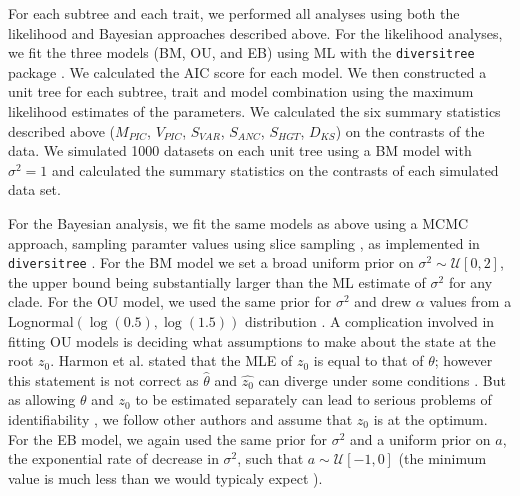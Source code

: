 \documentclass[a4paper,12pt]{article}
\begin{document}
For each subtree and each trait, we performed all analyses using both the likelihood and Bayesian approaches described above. For the likelihood analyses, we fit the three models (BM, OU, and EB) using ML with the \texttt{diversitree} package \citep{FitzJohn2012}. We calculated the AIC score for each model. We then constructed a unit tree for each subtree, trait and model combination using the maximum likelihood estimates of the parameters. We calculated the six summary statistics described above ($M_{PIC}$, $V_{PIC}$, $S_{VAR}$, $S_{ANC}$, $S_{HGT}$, $D_{KS}$) on the contrasts of the data. We simulated 1000 datasets on each unit tree using a BM model with $\sigma^2=1$ and calculated the summary statistics on the contrasts of each simulated data set. 

For the Bayesian analysis, we fit the same models as above using a MCMC approach, sampling paramter values using slice sampling \citep{Nealslice}, as implemented in  \texttt{diversitree} \citep{FitzJohn2012}. For the BM model we set a broad uniform prior on $\sigma^2 \sim \mathcal{U}[0, 2]$, the upper bound being substantially larger than the ML estimate of $\sigma^2$ for any clade. For the OU model, we used the same prior for $\sigma^2$ and drew $\alpha$ values from a Lognormal$(\log(0.5), \log(1.5))$ distribution \citep{UyedaBayou}. A complication involved in fitting OU models is deciding what assumptions to make about the state at the root $z_0$. Harmon et al. \citep{Harmon2010} stated that the MLE of $z_0$ is equal to that of $\theta$; however this statement is not correct as $\hat{\theta}$ and $\hat{z_0}$ can diverge under some conditions \citep{HoAne2012}. But as allowing $\theta$ and $z_0$ to be estimated separately can lead to serious problems of identifiability \citep{HoAne2012}, we follow other authors \citep{ButlerKing2004, Beaulieu2012} and assume that $z_0$ is at the optimum. For the EB model, we again used the same prior for $\sigma^2$ and a uniform prior on $a$, the exponential rate of decrease in $\sigma^2$, such that $a \sim \mathcal{U}[-1, 0]$ (the minimum value is much less than we would typicaly expect \citep{SlaterPennell}).
\end{document}
